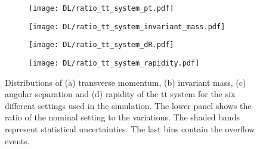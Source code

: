\begin{figure}[H]
    \centering
    \begin{subfigure}{0.49\textwidth}
        \centering
        \texttt{[image: DL/ratio\_tt\_system\_pt.pdf]}
        \caption{}
        \label{app:subfig:pt(ttbar)_DL}
    \end{subfigure}
    \begin{subfigure}{0.49\textwidth}
        \centering
        \texttt{[image: DL/ratio\_tt\_system\_invariant\_mass.pdf]}
        \caption{}
        \label{app:subfig:m(ttbar_DL}
    \end{subfigure}

    \vspace{0.2cm}
    
    \begin{subfigure}{0.49\textwidth}
        \centering
        \texttt{[image: DL/ratio\_tt\_system\_dR.pdf]}
        \caption{}
        \label{app:subfig:dR(ttbar)_DL}
    \end{subfigure}
    \begin{subfigure}{0.49\textwidth}
        \centering
        \texttt{[image: DL/ratio\_tt\_system\_rapidity.pdf]}
        \caption{}
        \label{app:subfig:y(ttbar)_DL}
    \end{subfigure}
    \caption{Distributions of (a) transverse momentum, (b) invariant mass,  (c) angular separation and (d) rapidity of the t$\overline{\text{t}}$ system for the six different settings used in the simulation. The lower panel shows the ratio of the nominal setting to the variations. The shaded bands represent statistical uncertainties. The last bins contain the overflow events.}
    \label{app:fig:ttbar_DL}
\end{figure}



